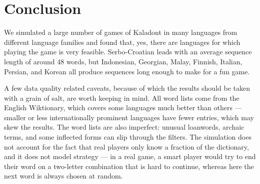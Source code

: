 \section{Conclusion}

We simulated a large number of games of Kaladont in many languages from different language families and found that, yes, there are languages for which playing the game is very feasible.
Serbo-Croatian leads with an average sequence length of around 48 words, but Indonesian, Georgian, Malay, Finnish, Italian, Persian, and Korean all produce sequences long enough to make for a fun game.

A few data quality related caveats, because of which the results should be taken with a grain of salt, are worth keeping in mind.
All word lists come from the English Wiktionary, which covers some languages much better than others — smaller or less internationally prominent languages have fewer entries, which may skew the results.
The word lists are also imperfect: unusual loanwords, archaic terms, and some inflected forms can slip through the filters.
The simulation does not account for the fact that real players only know a fraction of the dictionary, and it does not model strategy — in a real game, a smart player would try to end their word on a two-letter combination that is hard to continue, whereas here the next word is always chosen at random.
